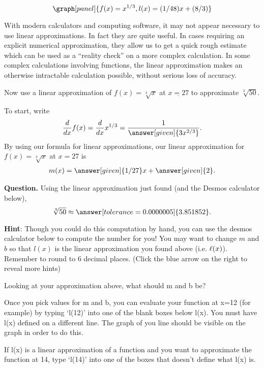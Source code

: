 \documentclass[handout,nooutcomes]{ximera}
\begin{document}
\begin{example}
\begin{explanation}
\[
\graph[panel]{f(x) = x^{1/3}, l(x) = (1/48) x + (8/3)}
\]


\end{explanation}
\end{example}

With modern calculators and computing software, it may not appear
necessary to use linear approximations. In fact they are quite
useful. In cases requiring an explicit numerical approximation, they
allow us to get a quick rough estimate which can be used as a
``reality check'' on a more complex calculation. In some complex
calculations involving functions, the linear approximation makes an
otherwise intractable calculation possible, without serious loss of
accuracy.


\begin{example}
Now use a linear approximation of $f(x) =\sqrt[3]{x}$ at $\underline{x=27}$ to
approximate $\sqrt[3]{50}$.
\begin{explanation}
To start, write
\[
\ddx f(x) = \ddx x^{1/3} = \frac{1}{\answer[given]{3x^{2/3}}}.
\]
By using our formula for linear approximations, our linear 
approximation for $f(x)=\sqrt[3]{x}$ at $x=27$ is
\begin{align*}
m(x) &= \answer[given]{1/27}x + \answer[given]{2}.\\
\end{align*}

\bigskip

\textbf{Question. } Using the linear approximation just found (and the Desmos calculator below),
\[
\sqrt[3]{50} \approx \answer[tolerance=0.0000005]{3.851852}.\\
\]

\bigskip

\textbf{Hint}: Though you could do this computation by hand, you can use
the desmos calculator below to compute the number for you! You may want
to change $m$ and $b$ so that $l(x)$ is the linear approximation you
found above (i.e. $\ell(x)$). Remember to round to 6 decimal places.
(Click the blue arrow on the right to reveal more hints)

\begin{expandable}
Looking at your approximation above, what should m and b be?
\begin{expandable}
Once you pick values for m and b, you can evaluate your function
at x=12 (for example) by typing `l(12)' into one of the blank boxes below l(x).
You must have l(x) defined on a different line. The graph of you line
should be visible on the graph in order to do this.
\begin{expandable}
If l(x) is a linear approximation of a function and you want to approximate
the function at 14, type `l(14)' into one of the boxes that doesn't define what l(x) is.
\end{expandable}
\end{expandable}
\end{expandable}


\end{explanation}
\end{example}
\end{document}
